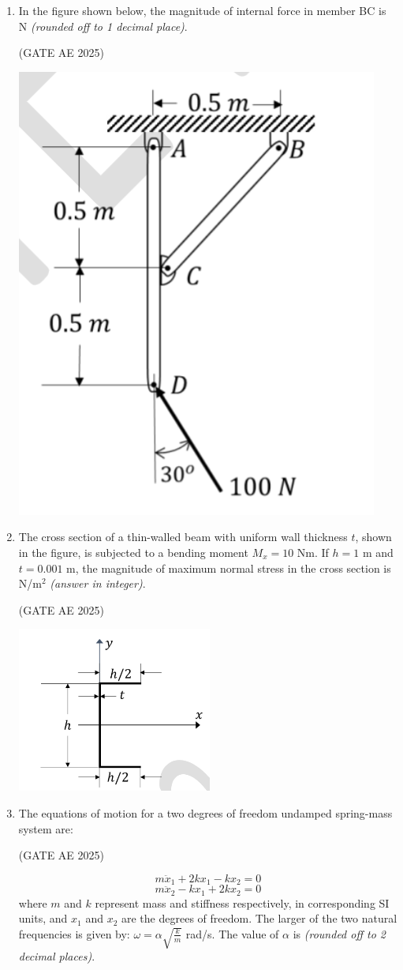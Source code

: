 \documentclass[journal,12pt,onecolumn]{IEEEtran}
\theoremstyle{remark}
\begin{document}
\begin{flushleft}
\begin{enumerate}
\item In the figure shown below, the magnitude of internal force in member BC is \underline{\hspace{3cm}} N \textit{(rounded off to 1 decimal place)}. 

\hfill (GATE AE 2025)

\begin{center}
\includegraphics[width=0.3\columnwidth]{figs/53.png}
\end{center}


\item The cross section of a thin-walled beam with uniform wall thickness $t$, shown in the figure, is subjected to a bending moment $M_x = 10$ Nm. If $h = 1$ m and $t = 0.001$ m, the magnitude of maximum normal stress in the cross section is \underline{\hspace{3cm}} N/m$^2$ \textit{(answer in integer)}.

\hfill (GATE AE 2025)

\begin{center}
\includegraphics[width=0.4\columnwidth]{figs/54.png}
\end{center}

\item The equations of motion for a two degrees of freedom undamped spring-mass system are:

\hfill (GATE AE 2025)

\[
m\ddot{x}_1 + 2kx_1 - kx_2 = 0
\]
\[
m\ddot{x}_2 - kx_1 + 2kx_2 = 0
\]
where $m$ and $k$ represent mass and stiffness respectively, in corresponding SI units, and $x_1$ and $x_2$ are the degrees of freedom. The larger of the two natural frequencies is given by: $\omega = \alpha \sqrt{\frac{k}{m}}$ rad/s. The value of $\alpha$ is \underline{\hspace{3cm}} \textit{(rounded off to 2 decimal places)}.


\end{enumerate}
\end{flushleft}
\end{document}
